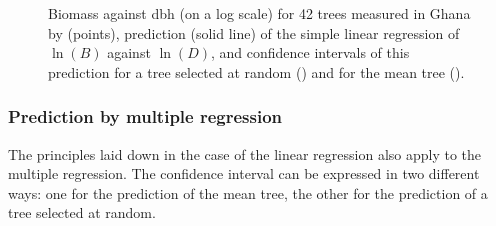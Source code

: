 \begin{figure}[htb]
\begin{center}
\end{center}
\caption[Biomass against dbh (on a log scale) for 42 trees measured in Ghana by \citet{henry10} prediction of the simple linear regression of $\ln(B)$ against $\ln(D)$]{Biomass against dbh (on a log scale) for 42 trees measured in Ghana by
\citet{henry10} (points), prediction (solid line) of the simple linear regression of $\ln(B)$ against $\ln(D)$, and confidence intervals of this prediction for a tree selected at random 
() and for the mean tree 
().\label{icD}}
\end{figure}

\subsubsection{Prediction by multiple regression}

The principles laid down in the case of the linear regression also apply to the multiple regression. The confidence interval can be expressed in two different ways: one for the prediction of the mean tree, the other for the prediction of a tree selected at random.

